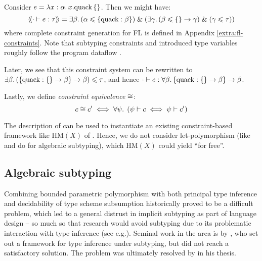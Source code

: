 \begin{example}
    Consider $e = \lambda {x: \alpha} \ldotp {x}{.}{\mathrm{quack}}\,\{\}$. Then we might have:
    $$ \cstr{\cdot}{e}{\tau} = \exists \beta \ldotp (\alpha \sub \flrec{\mathrm{quack}: \beta}) \und \left( \exists \gamma \ldotp (\beta \sub \flrec{} \to \gamma) \und (\gamma \sub \tau) \right) $$
    where complete constraint generation for FL is defined in Appendix \ref{extra:fl-constraints}. Note that subtyping constraints and introduced type variables roughly follow the program dataflow \cite{mlsub}.

    Later, we see that this constraint system can be rewritten to $\exists \beta \ldotp (\flrec{\mathrm{quack} : \flrec{} \to \beta} \to \beta) \sub \tau$, and hence $\cdot \vdash e : \forall \beta \ldotp \flrec{\mathrm{quack} : \flrec{} \to \beta} \to \beta$.
\end{example}

Lastly, we define \emph{constraint equivalence} $\cong$:
$$ c \cong c' \iff  \forall \psi \ldotp \; (\psi \vdash c \iff \psi \vdash c') $$

The description of \inference{} can be used to instantiate an existing constraint-based framework like $\mathrm{HM}(X)$ of \textcite{constraint-based-hm}. Hence, we do not consider let-polymorphism (like \textcite{dolan-thesis} and \textcite{simple-sub} do for algebraic subtyping), which $\mathrm{HM}(X)$ could yield \enquote{for free}.


\subsection{Algebraic subtyping}
\label{subsec:algebraic-subtyping-background}

Combining bounded parametric polymorphism with both principal type inference and decidability of type scheme subsumption historically proved to be a difficult problem, which led to a general distrust in implicit subtyping as part of language design \cite{mlstruct} -- so much so that research would avoid subtyping due to its problematic interaction with type inference (see e.g.\@ \cite[Section~3.5]{linear-haskell}). Seminal work in the area is by \textcite{pottier-thesis}, who set out a framework for type inference under subtyping, but did not reach a satisfactory solution. The problem was ultimately resolved by \textcite{dolan-thesis} in his thesis.

